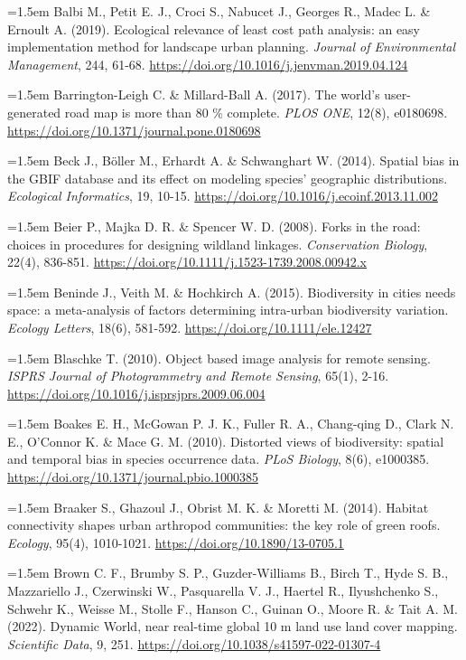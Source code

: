 \documentclass[a4paper,12pt]{report}
\begin{document}
\noindent\hangindent=1.5em Balbi M., Petit E. J., Croci S., Nabucet J., Georges R., Madec L. \& Ernoult A. (2019). Ecological relevance of least cost path analysis: an easy implementation method for landscape urban planning. \textit{Journal of Environmental Management}, 244, 61-68. \url{https://doi.org/10.1016/j.jenvman.2019.04.124}\par\medskip
\noindent\hangindent=1.5em Barrington-Leigh C. \& Millard-Ball A. (2017). The world's user-generated road map is more than 80 \% complete. \textit{PLOS ONE}, 12(8), e0180698. \url{https://doi.org/10.1371/journal.pone.0180698}\par\medskip
\noindent\hangindent=1.5em Beck J., Böller M., Erhardt A. \& Schwanghart W. (2014). Spatial bias in the GBIF database and its effect on modeling species' geographic distributions. \textit{Ecological Informatics}, 19, 10-15. \url{https://doi.org/10.1016/j.ecoinf.2013.11.002}\par\medskip
\noindent\hangindent=1.5em Beier P., Majka D. R. \& Spencer W. D. (2008). Forks in the road: choices in procedures for designing wildland linkages. \textit{Conservation Biology}, 22(4), 836-851. \url{https://doi.org/10.1111/j.1523-1739.2008.00942.x}\par\medskip
\noindent\hangindent=1.5em Beninde J., Veith M. \& Hochkirch A. (2015). Biodiversity in cities needs space: a meta-analysis of factors determining intra-urban biodiversity variation. \textit{Ecology Letters}, 18(6), 581-592. \url{https://doi.org/10.1111/ele.12427}\par\medskip
\noindent\hangindent=1.5em Blaschke T. (2010). Object based image analysis for remote sensing. \textit{ISPRS Journal of Photogrammetry and Remote Sensing}, 65(1), 2-16. \url{https://doi.org/10.1016/j.isprsjprs.2009.06.004}\par\medskip
\noindent\hangindent=1.5em Boakes E. H., McGowan P. J. K., Fuller R. A., Chang-qing D., Clark N. E., O'Connor K. \& Mace G. M. (2010). Distorted views of biodiversity: spatial and temporal bias in species occurrence data. \textit{PLoS Biology}, 8(6), e1000385. \url{https://doi.org/10.1371/journal.pbio.1000385}\par\medskip
\noindent\hangindent=1.5em Braaker S., Ghazoul J., Obrist M. K. \& Moretti M. (2014). Habitat connectivity shapes urban arthropod communities: the key role of green roofs. \textit{Ecology}, 95(4), 1010-1021. \url{https://doi.org/10.1890/13-0705.1}\par\medskip
\noindent\hangindent=1.5em Brown C. F., Brumby S. P., Guzder-Williams B., Birch T., Hyde S. B., Mazzariello J., Czerwinski W., Pasquarella V. J., Haertel R., Ilyushchenko S., Schwehr K., Weisse M., Stolle F., Hanson C., Guinan O., Moore R. \& Tait A. M. (2022). Dynamic World, near real-time global 10 m land use land cover mapping. \textit{Scientific Data}, 9, 251. \url{https://doi.org/10.1038/s41597-022-01307-4}\par\medskip
\end{document}
